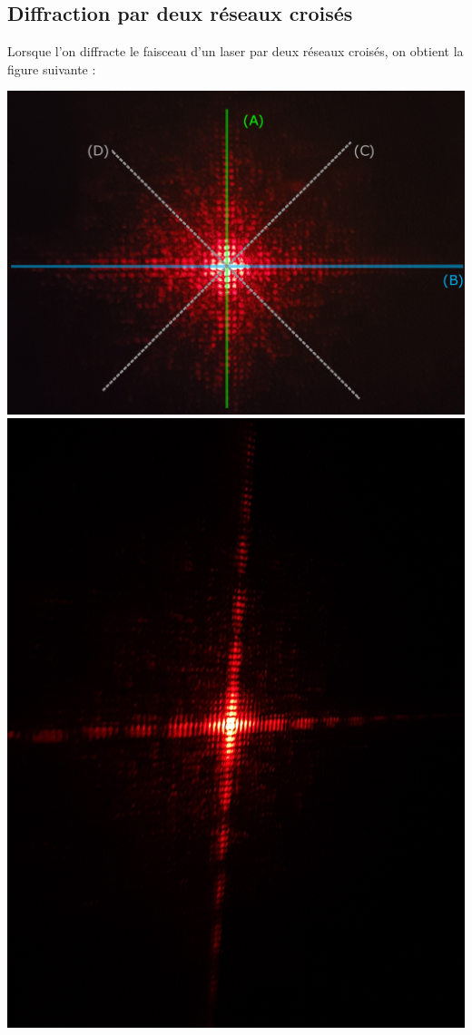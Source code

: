 \documentclass[12pt,a4paper]{article}
\begin{document}
	\subsection{Diffraction par deux réseaux croisés}
	Lorsque l'on diffracte le faisceau d'un laser par deux réseaux croisés, on obtient la figure suivante :\\
	\begin{bigcenter}
	\begin{multicols}{2}
			\includegraphics[width=\linewidth]{res/reseaux_axes}
			\columnbreak
			\includegraphics[width=\linewidth, trim= 25cm 20cm 25cm 20cm,clip]{"res/reseaux"}
	\end{multicols}
	\end{bigcenter}
\end{document}
